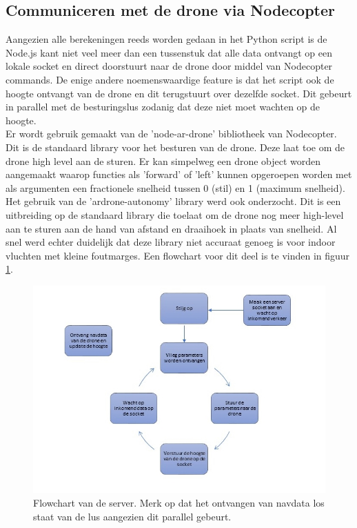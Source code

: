 \subsection{Communiceren met de drone via Nodecopter}
Aangezien alle berekeningen reeds worden gedaan in het Python script is de Node.js kant niet veel meer dan een tussenstuk dat alle data ontvangt op een lokale socket en direct doorstuurt naar de drone door middel van Nodecopter commands. De enige andere noemenswaardige feature is dat het script ook de hoogte ontvangt van de drone en dit terugstuurt over dezelfde socket. Dit gebeurt in parallel met de besturingslus zodanig dat deze niet moet wachten op de hoogte.\\

Er wordt gebruik gemaakt van de 'node-ar-drone' bibliotheek van Nodecopter. Dit is de standaard library voor het besturen van de drone. Deze laat toe om de drone high level aan de sturen. Er kan simpelweg een drone object worden aangemaakt waarop functies als 'forward' of 'left' kunnen opgeroepen worden met als argumenten een fractionele snelheid tussen 0 (stil) en 1 (maximum snelheid).\\

Het gebruik van de 'ardrone-autonomy' library werd ook onderzocht. Dit is een uitbreiding op de standaard library die toelaat om de drone nog meer high-level aan te sturen aan de hand van afstand en draaihoek in plaats van snelheid.
Al snel werd echter duidelijk dat deze library niet accuraat genoeg is  voor indoor vluchten met kleine foutmarges.
Een flowchart voor dit deel is te vinden in figuur \ref{fig:flowchart_server}.
\begin{figure}[p]
	\centering
	\includegraphics[width=\textwidth]{images/node_server_flowchart}
	\caption[Flowchart van de server]{Flowchart van de server. Merk op dat het ontvangen van navdata los staat van de lus aangezien dit parallel gebeurt.}
	\label{fig:flowchart_server}
\end{figure}


